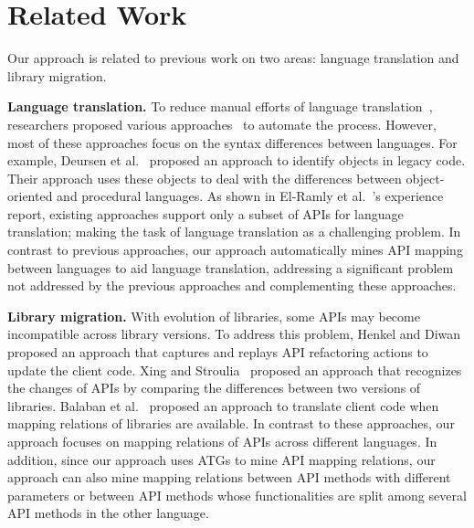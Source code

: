 \section{Related Work}
\label{sec:related}

Our approach is related to previous work on two areas:
language translation and library migration.

\textbf{Language translation.} To reduce manual efforts of language
translation~\cite{samet1981experience}, researchers proposed various
approaches~\cite{hassan2005lightweight,van1999identifying,waters1988program,mossienko2003automated,yasumatsu1995spice} to automate the process.
However, most of these approaches focus on the syntax differences between
languages. For example, Deursen et al.~\cite{van1999identifying} proposed an approach to identify
objects in legacy code. Their approach uses these objects to deal with the
differences between object-oriented and procedural languages. As
shown in El-Ramly et al.~\cite{el2006experiment}'s experience
report, existing approaches support only a subset of APIs for language translation;
making the task of language translation as a challenging problem.
In contrast to previous approaches, our approach automatically mines API mapping between
languages to aid language translation, addressing a significant
problem not addressed by the previous approaches and complementing
these approaches.

\textbf{Library migration.} With evolution of libraries, some APIs
may become incompatible across library versions. To address this
problem, Henkel and Diwan~\cite{henkel2005catchup} proposed an approach that captures
and replays API refactoring actions to update the client code.
Xing and Stroulia~\cite{xing2007api} proposed an approach that
recognizes the changes of APIs by comparing the differences between two
versions of libraries. Balaban et al.~\cite{balaban2005refactoring} proposed 
an approach to translate client code when mapping relations of libraries are
available. In contrast to these approaches, our approach focuses on
mapping relations of APIs across different languages. In addition, since
our approach uses ATGs to mine API mapping relations, our approach can also 
mine mapping relations between API methods with different parameters or between
API methods whose functionalities are split among several API methods in the other language.
